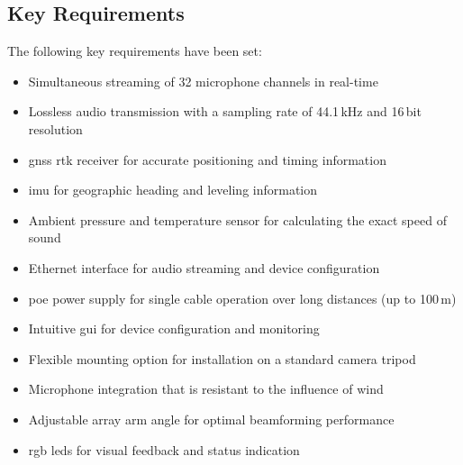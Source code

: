 \subsection{Key Requirements}
The following key requirements have been set:
\begin{itemize}
	\item Simultaneous streaming of 32 microphone channels in real-time
	\item Lossless audio transmission with a sampling rate of 44.1\,kHz and 16\,bit resolution
	\item \acrshort{gnss} \acrshort{rtk} receiver for accurate positioning and timing information
	\item \acrshort{imu} for geographic heading and leveling information
	\item Ambient pressure and temperature sensor for calculating the exact speed of sound
	\item Ethernet interface for audio streaming and device configuration
	\item \acrshort{poe} power supply for single cable operation over long distances (up to 100\,m)
	\item Intuitive \acrfull{gui} for device configuration and monitoring
	\item Flexible mounting option for installation on a standard camera tripod
	\item Microphone integration that is resistant to the influence of wind
	\item Adjustable array arm angle for optimal beamforming performance
	\item \acrshort{rgb} \acrshort{led}s for visual feedback and status indication
\end{itemize}

